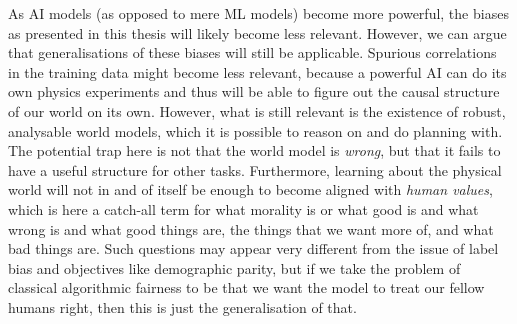As AI models (as opposed to mere \ac{ML} models) become more powerful,
the biases as presented in this thesis will likely become less relevant.
However, we can argue that generalisations of these biases will still be applicable.
Spurious correlations in the training data might become less relevant,
because a powerful AI can do its own physics experiments
and thus will be able to figure out the causal structure of our world on its own.
However, what is still relevant is the existence of robust, analysable world models,
which it is possible to reason on and do planning with.
The potential trap here is not that the world model is \emph{wrong},
but that it fails to have a useful structure for other tasks.
Furthermore, learning about the physical world will not in and of itself be enough to
become aligned with \emph{human values},
which is here a catch-all term for
what morality is or what good is and what wrong is and what good things are,
the things that we want more of, and what bad things are.
Such questions may appear very different from the issue of label bias
and objectives like demographic parity,
but if we take the problem of classical algorithmic fairness to be
that we want the model to treat our fellow humans right,
then this is just the generalisation of that.
